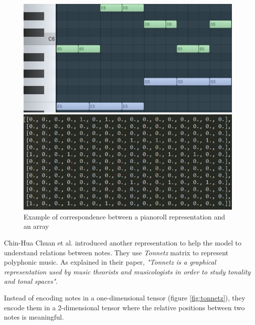 \documentclass[12pt]{report}
\begin{document}
\begin{figure}[H]
   \begin{minipage}{0.5\textwidth}
     \centering
     \includegraphics[width=.9\linewidth]{images/music/pianoroll/pianoroll_small.jpg}
   \end{minipage}\hfill
   \begin{minipage}{0.5\textwidth}
     \centering
     \includegraphics[width=\linewidth]{images/music/pianoroll/pianoroll_small_array.jpg}
   \end{minipage}
 \caption{Example of correspondence between a pianoroll representation and an array}
 \label{fig:pianoroll_to_array}
\end{figure}

\bigskip

Chin-Hua Chuan et al. \cite{chuan_modeling_nodate} introduced another representation to help the model to understand relations between notes.
They use \textit{Tonnetz} matrix \cite{mason_essential_nodate} to represent polyphonic music.
As explained in their paper, \textit{"Tonnetz is a graphical representation used by music theorists and musicologists in order to study tonality and tonal spaces"}.

Instead of encoding notes in a one-dimensional tensor (figure \ref{fig:tonnetz}), they encode them in a 2-dimensional tensor where the relative positions between two notes is meaningful.
\end{document}
